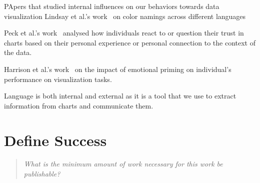 \documentclass{proc}
\begin{document}
PApers that studied internal influences on our behaviors towards data visualization
Lindsay et al.'s work~\cite{lindsey2009world} on color namings across different languages

Peck et al.'s work~\cite{peck2019data} analysed how individuals react to or question their trust in charts based on their personal experience or personal connection to the context of the data. 

Harrison et al.'s work~\cite{harrison2012exploring} on the impact of emotional priming on individual's performance on visualization tasks. 

Language is both internal and external as it is a tool that we use to extract information from charts and communicate them.
\section{Define Success}
\begin{quote}
\textit{What is the minimum amount of work necessary for this work be publishable?}
\end{quote}



\end{document}
